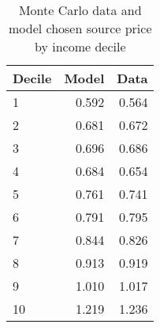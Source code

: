 \begin{table}[!ht]
	\centering
		\caption{Monte Carlo data and model chosen source price by income decile}
\begin{tabular}{lrr}
		\toprule
         Decile&     Model&      Data\\
		\midrule
		              1&     0.592&     0.564\\
		              2&     0.681&     0.672\\
		              3&     0.696&     0.686\\
		              4&     0.684&     0.654\\
		              5&     0.761&     0.741\\
		              6&     0.791&     0.795\\
		              7&     0.844&     0.826\\
		              8&     0.913&     0.919\\
		              9&     1.010&     1.017\\
		             10&     1.219&     1.236\\
		\bottomrule
	\end{tabular}
\end{table}
